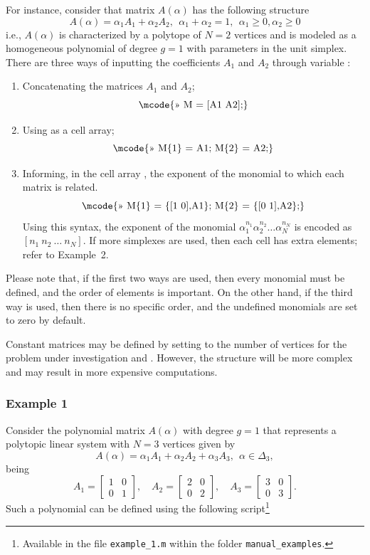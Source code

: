 \documentclass[english,11pt]{article}
\theoremstyle{break} \theorembodyfont{\small\rm}
\begin{document}
For instance, consider that matrix $A(\alpha)$ has the following structure
\[
A(\alpha) = \alpha_1 A_1 + \alpha_2 A_2, ~~\alpha_1 + \alpha_2 = 1, ~~  \alpha_1 \geq 0, \alpha_2 \geq 0
\]
i.e., $A(\alpha)$ is characterized by a polytope of $N = 2$ vertices and is
modeled as a homogeneous polynomial of degree $g = 1$ with parameters in the unit simplex. There are three ways of inputting
the coefficients $A_1$ and $A_2$ through variable :
\begin{enumerate}
\item Concatenating the matrices $A_1$ and $A_2$;
\[
\mbox{\mcode{>> M = [A1 A2];}}
\]

\item Using  as a cell array;
\begin{equation}\label{eq_cell_array}
\mbox{\mcode{>> M\{1\} = A1; M\{2\} = A2;}}
\end{equation}

\item Informing, in the cell array , the exponent of the monomial to which each matrix
is related.
\begin{equation}\label{eq_cell_array_expon}
 \mbox{\mcode{>> M\{1\} = \{[1 0],A1\}; M\{2\} = \{[0 1],A2\};}}
\end{equation}
Using this syntax, the exponent of the monomial $\alpha_1^{n_1}\alpha_2^{n_2} \ldots \alpha_N^{n_N}$
is encoded as $[n_1 ~ n_2 ~ \ldots ~ n_N]$. If more simplexes are used, then each cell has
extra elements; refer to Example~2.
\end{enumerate}
Please note that, if the first two ways are used, then every monomial must be defined,
and the order of elements is important. On the other hand, if the third way is used,
then there is no specific order, and the undefined monomials are set to zero by
default.

Constant matrices may be defined by setting  to
the number of vertices for the problem under investigation and . However,
the structure will be more complex and may result in more expensive
computations.


\subsubsection*{Example 1}
Consider the polynomial matrix $A(\alpha)$ with degree $g=1$ that represents a polytopic linear system
with $N = 3$ vertices given by
\[
A(\alpha) = \alpha_1 A_1 + \alpha_2 A_2 + \alpha_3 A_3, ~ ~  \alpha \in \Delta_3,
\]
being
\[
 A_1 = \begin{bmatrix} 1 & 0 \\ 0 & 1 \end{bmatrix}, \quad
 A_2 = \begin{bmatrix} 2 & 0 \\ 0 & 2 \end{bmatrix}, \quad
 A_3 = \begin{bmatrix} 3 & 0 \\ 0 & 3 \end{bmatrix}.
\]
Such a polynomial can be defined using the following script\footnote{Available in the file \texttt{example\_1.m} within the folder \texttt{manual\_examples}.}
\end{document}
